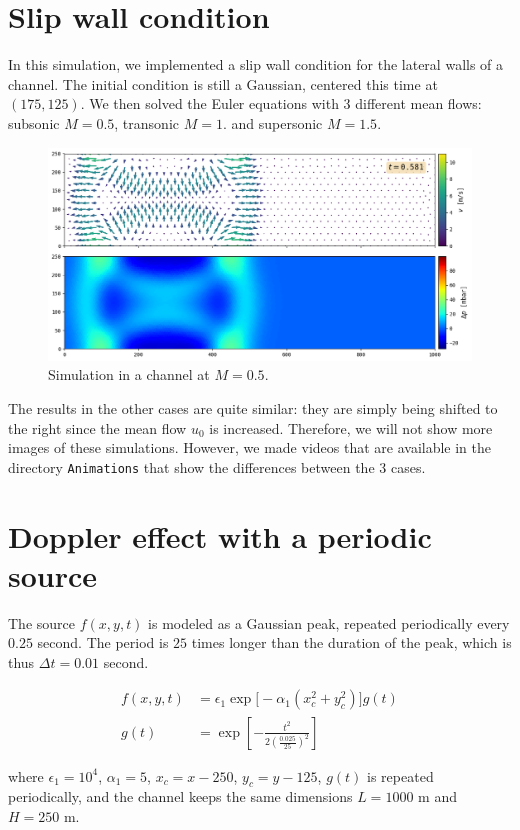 \documentclass[11 pt]{article}
\begin{document}
\section{Slip wall condition}
In this simulation, we implemented a slip wall condition for the lateral walls of a channel. The initial condition is still a Gaussian, centered this time at $(175, 125)$. We then solved the Euler equations with 3 different mean flows: subsonic $M=0.5$, transonic $M=1.$ and supersonic $M=1.5$.
\begin{figure}[H]
    \centering
    \includegraphics[width=\textwidth]{../figures/simu_1.png}
    \caption{Simulation in a channel at $M=0.5$.}
    \label{fig:channel_subsonic}
\end{figure}

The results in the other cases are quite similar: they are simply being shifted to the right since the mean flow $u_0$ is increased. Therefore, we will not show more images of these simulations. However, we made videos that are available in the directory \texttt{Animations} that show the differences between the 3 cases.

\section{Doppler effect with a periodic source}
The source $f(x,y,t)$ is modeled as a Gaussian peak, repeated periodically every $0.25$ second. The period is $25$ times longer than the duration of the peak, which is thus $\Delta t = 0.01$ second.

\begin{align*}
    f(x,y,t) &= \epsilon_1 \exp\big[-\alpha_1 (x_c^2+y_c^2)\big] g(t)\\
    g(t) &= \exp\left[-\frac{t^2}{2 \left(\frac{0.025}{25}\right)^2}\right]
\end{align*}

where $\epsilon_1=10^4$, $\alpha_1=5$, $x_c=x-250$, $y_c=y-125$, $g(t)$ is repeated periodically, and the channel keeps the same dimensions $L=1000$ m and $H=250$ m.
\end{document}
